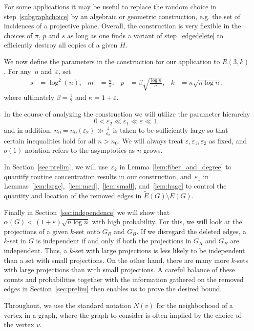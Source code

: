 \documentclass{article}
\begin{document}
For some applications it may be useful to replace the random choice in step~\ref{subgraphchoice} by an algebraic or geometric construction, e.g. the set of incidences of a projective plane. Overall, the construction is very flexible in the choices of $\pi$, $p$ and $s$ as long as one finds a variant of step~\ref{edgedelete} to efficiently destroy all copies of a given $H$.


We now define the parameters in the construction for our application to $R(3,k)$.
For any~$n$ and~$\varepsilon$, set
\begin{align*}
	s &= \log^2(n),&
    {m} &= \frac{n}{s},&
	p &= \beta \sqrt{ \frac{\log n}{n}},&
	k &= \kappa \sqrt{n \log n},
\end{align*}    
where ultimately
$\beta = \frac{1}{2}$ and $\kappa = 1 + \varepsilon$.


In the course of analyzing the construction we will utilize the parameter hierarchy
\[
0<  \varepsilon_2 \ll \varepsilon_1 \ll \varepsilon \ll 1,
\]
and in addition, $n_0 =n_0(\varepsilon_2)\gg \frac1{\varepsilon_2}$ is taken 
to be sufficiently large so that certain inequalities hold for all $n > n_0$. We will always treat $\varepsilon,\varepsilon_1,\varepsilon_2$ as fixed, and $o(1)$ notation refers to the asymptotics as $n$ grows.

In Section~\ref{sec:prelim}, we will use~$\varepsilon_2$ in Lemma~\ref{lem:fiber_and_degree} to quantify routine concentration results in our construction, and~$\varepsilon_1$  in Lemmas~\ref{lem:large},~\ref{lem:med},~\ref{lem:small}, and~\ref{lem:huge}  
to control the quantity and location of the removed edges in $\tilde{E}(G)\setminus E(G)$.


Finally in Section~\ref{sec:independence} we will show that~$\alpha(G) < (1+\varepsilon)\sqrt{n \log n}$ with high probability. For this, we will look at the projections of a given $k$-set onto $G_R$ and $G_B$. If we disregard the deleted edges, a $k$-set in $G$ is independent if and only if both the projections in $G_R$ and $G_B$ are independent. Thus, a $k$-set with large projections is less likely to be independent than a set with small projections. On the other hand, there are many more $k$-sets with large projections than with small projections. A careful balance of these counts and probabilities together with the information gathered on the removed edges in Section~\ref{sec:prelim} then enables us to prove the desired bound.
 
Throughout, we use the standard notation $N(v)$ for the neighborhood of a vertex in a graph, where the graph to consider is often implied by the choice of the vertex $v$.
\end{document}
